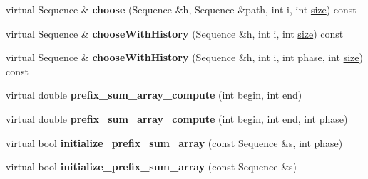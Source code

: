 \begin{DoxyCompactItemize}
\item 
\mbox{\label{classtops_1_1FixedSequenceAtPosition_a241d9315ae90fe8d8f57c8072af72a22}} 
virtual Sequence \& {\bfseries choose} (Sequence \&h, Sequence \&path, int i, int \hyperlink{classtops_1_1ProbabilisticModel_a4e3910e9b9b848b7078e7101909ae82a}{size}) const
\item 
\mbox{\label{classtops_1_1FixedSequenceAtPosition_ad5cfee86e160eb7249cd1f850aa53adf}} 
virtual Sequence \& {\bfseries choose\+With\+History} (Sequence \&h, int i, int \hyperlink{classtops_1_1ProbabilisticModel_a4e3910e9b9b848b7078e7101909ae82a}{size}) const
\item 
\mbox{\label{classtops_1_1FixedSequenceAtPosition_a58e48dfdfdba8a8269508217fe5e0e6a}} 
virtual Sequence \& {\bfseries choose\+With\+History} (Sequence \&h, int i, int phase, int \hyperlink{classtops_1_1ProbabilisticModel_a4e3910e9b9b848b7078e7101909ae82a}{size}) const
\item 
\mbox{\label{classtops_1_1FixedSequenceAtPosition_a1600948006e576c46958c69eb3b9dde9}} 
virtual double {\bfseries prefix\+\_\+sum\+\_\+array\+\_\+compute} (int begin, int end)
\item 
\mbox{\label{classtops_1_1FixedSequenceAtPosition_a7aa2ee2c289eb7538c8fff063b17fdbc}} 
virtual double {\bfseries prefix\+\_\+sum\+\_\+array\+\_\+compute} (int begin, int end, int phase)
\item 
\mbox{\label{classtops_1_1FixedSequenceAtPosition_acb1f8bebd2815c580c66526c55b292e7}} 
virtual bool {\bfseries initialize\+\_\+prefix\+\_\+sum\+\_\+array} (const Sequence \&s, int phase)
\item 
\mbox{\label{classtops_1_1FixedSequenceAtPosition_a61cf8b9a9e91b1785fe52f05fc6d041e}} 
virtual bool {\bfseries initialize\+\_\+prefix\+\_\+sum\+\_\+array} (const Sequence \&s)
\item 
\mbox{\label{classtops_1_1FixedSequenceAtPosition_a55c81be8635c092f980689e7fa723998}} 

\end{DoxyCompactItemize}
